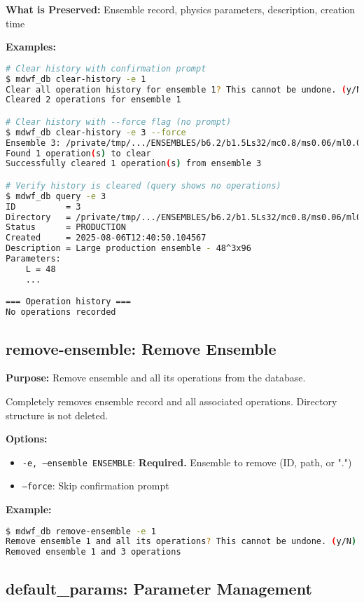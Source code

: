 \documentclass{article}
\begin{document}
\textbf{What is Preserved:}
Ensemble record, physics parameters, description, creation time

\textbf{Examples:}
\begin{lstlisting}[language=bash]
# Clear history with confirmation prompt
$ mdwf_db clear-history -e 1
Clear all operation history for ensemble 1? This cannot be undone. (y/N) y
Cleared 2 operations for ensemble 1

# Clear history with --force flag (no prompt)
$ mdwf_db clear-history -e 3 --force
Ensemble 3: /private/tmp/.../ENSEMBLES/b6.2/b1.5Ls32/mc0.8/ms0.06/ml0.015/L48/T96
Found 1 operation(s) to clear
Successfully cleared 1 operation(s) from ensemble 3

# Verify history is cleared (query shows no operations)
$ mdwf_db query -e 3
ID          = 3
Directory   = /private/tmp/.../ENSEMBLES/b6.2/b1.5Ls32/mc0.8/ms0.06/ml0.015/L48/T96
Status      = PRODUCTION
Created     = 2025-08-06T12:40:50.104567
Description = Large production ensemble - 48^3x96
Parameters:
    L = 48
    ...

=== Operation history ===
No operations recorded
\end{lstlisting}

\subsection{remove-ensemble: Remove Ensemble}

\textbf{Purpose:} Remove ensemble and all its operations from the database.

Completely removes ensemble record and all associated operations. Directory structure is not deleted.

\textbf{Options:}
\begin{itemize}
\item \texttt{-e, --ensemble ENSEMBLE}: \textbf{Required.} Ensemble to remove (ID, path, or ".")
\item \texttt{--force}: Skip confirmation prompt
\end{itemize}

\textbf{Example:}
\begin{lstlisting}[language=bash]
$ mdwf_db remove-ensemble -e 1
Remove ensemble 1 and all its operations? This cannot be undone. (y/N) y
Removed ensemble 1 and 3 operations
\end{lstlisting}

\subsection{default\_params: Parameter Management}
\end{document}
